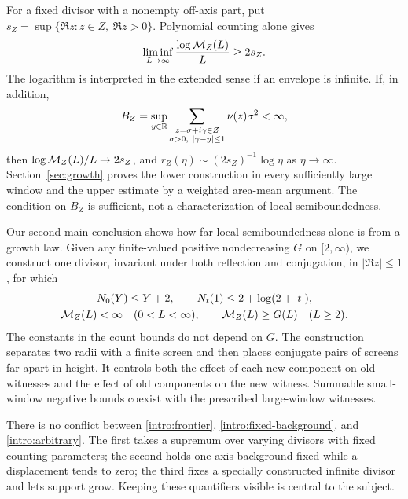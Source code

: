 For a fixed divisor with a nonempty off-axis part, put
\(s_Z=\sup\{\Re z:z\in Z,\ \Re z>0\}\). Polynomial counting
alone gives
\begin{equation}\label{intro:lower-growth}
 \liminf_{L\to\infty}\frac{\log\mathcal M_Z(L)}L\ge2s_Z.
\end{equation}
The logarithm is interpreted in the extended sense if an
envelope is infinite. If, in addition,
\[
 B_Z=\sup_{y\in\mathbb R}
 \sum_{\substack{z=\sigma+i\gamma\in Z\\
                 \sigma>0,\ |\gamma-y|\le1}}
       \nu(z)\sigma^2<\infty,
\]
then \(\log\mathcal M_Z(L)/L\to2s_Z\), and
\(r_Z(\eta)\sim(2s_Z)^{-1}\log\eta\) as \(\eta\to\infty\).
Section~\ref{sec:growth} proves the lower construction in
every sufficiently large window and the upper estimate by
a weighted area-mean argument. The condition on \(B_Z\)
is sufficient, not a characterization of local semiboundedness.

Our second main conclusion shows how far local semiboundedness
alone is from a growth law. Given any finite-valued positive
nondecreasing \(G\) on \([2,\infty)\), we construct one
divisor, invariant under both reflection and conjugation,
in \(|\Re z|\le1\), for which
\begin{equation}\label{intro:arbitrary}
 \begin{gathered}
 N_0(Y)\le Y+2,\qquad N_t(1)\le2+\log(2+|t|),\\
 \mathcal M_Z(L)<\infty\quad(0<L<\infty),\qquad
 \mathcal M_Z(L)\ge G(L)\quad(L\ge2).
 \end{gathered}
\end{equation}
The constants in the count bounds do not depend on \(G\).
The construction separates two radii with a finite screen
and then places conjugate pairs of screens far apart in
height. It controls both the effect of each new component
on old witnesses and the effect of old components on the
new witness. Summable small-window negative bounds coexist
with the prescribed large-window witnesses.

There is no conflict between \eqref{intro:frontier},
\eqref{intro:fixed-background}, and \eqref{intro:arbitrary}.
The first takes a supremum over varying divisors with fixed
counting parameters; the second holds one axis background
fixed while a displacement tends to zero; the third fixes
a specially constructed infinite divisor and lets support
grow. Keeping these quantifiers visible is central to the
subject.

